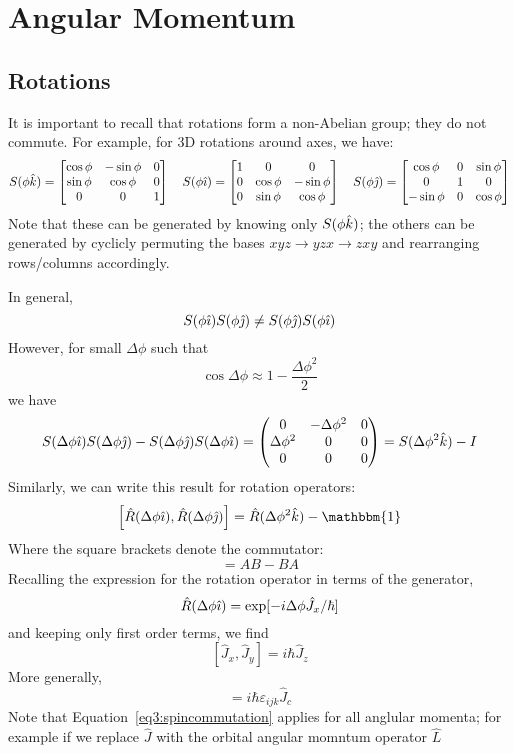 \chapter{Angular Momentum}
\section{Rotations}
It is important to recall that rotations form a non-Abelian group; they do not commute. For example, for 3D rotations around axes, we have:
\[S(\phi \hat{k})=\begin{bmatrix}\cos\phi & -\sin\phi & 0\\\sin\phi &\cos\phi &0\\0&0&1\end{bmatrix}\quad S(\phi\hat{\imath})=\begin{bmatrix}1 & 0 & 0\\ 0& \cos\phi &-\sin\phi \\ 0 & \sin\phi&\cos\phi \end{bmatrix} \quad S(\phi \hat{\jmath})=\begin{bmatrix}\cos\phi & 0 & \sin\phi \\ 0 & 1 & 0 \\ -\sin\phi & 0 & \cos\phi \end{bmatrix}\]
Note that these can be generated by knowing only \(S(\phi \hat{k})\); the others can be generated by cyclicly permuting the bases \(xyz \to yzx \to zxy\) and rearranging rows/columns accordingly.

In general, 
\[S(\phi \hat{\imath}) S(\phi \hat{\jmath}) \neq S(\phi \hat{\jmath}) S(\phi\hat{\imath})\]
However, for small \(\Delta \phi\) such that
\[\cos\Delta\phi \approx 1-\frac{\Delta \phi^2}{2}\]
we have
\begin{equation}
	S(\Delta \phi \hat{\imath}) S(\Delta \phi \hat{\jmath}) - S(\Delta \phi \hat{\jmath}) S(\Delta \phi\hat{\imath})=\begin{pmatrix}0 & -\Delta \phi^2 & 0 \\ \Delta \phi^2 & 0 & 0\\ 0&0&0\end{pmatrix}=S(\Delta \phi ^2\hat{k})-I
\end{equation}
Similarly, we can write this result for rotation operators:
\begin{equation}
	\left[\hat R (\Delta \phi \ih), \hat R (\Delta \phi \jh)\right]=\hat R(\Delta \phi^2\kh)-\mathbbm{1}
\end{equation}
Where the square brackets denote the commutator:
\begin{equation}
	[A,B]=AB-BA \label{eq3:commutator}
\end{equation}
Recalling the expression for the rotation operator in terms of the generator,
\[\hat R(\Delta \phi \hat{\imath})=\exp[-i\Delta\phi \hat{J}_x/\hbar]\]
and keeping only first order terms, we find
\[[\hat J_x, \hat J_y]=i\hbar\hat{J}_z\]
More generally,
\begin{equation}
	[\hat{J}_a, \hat{J}_b]=i\hbar \varepsilon_{ijk}\hat{J}_c\label{eq3:spincommutation}
\end{equation}
Note that Equation~\ref{eq3:spincommutation} applies for all anglular momenta; for example if we replace \(\hat J\) with the orbital angular momntum operator \(\hat L\)

